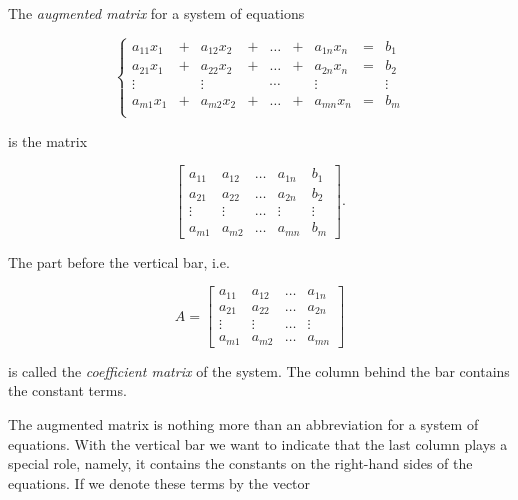 \begin{dfn}
\label{Dfn:LinSystems:AugmentedMatrix}
The \emph{augmented matrix} for a system of equations

$$
   \left\{
\begin{array}{ccccccccc}
            a_{11}x_1\! & \!+\!&\!a_{12}x_2\! & \!+\!&\! \ldots\! & \!+\!&\!a_{1n}x_n  \! & \!=\!&\!  b_1 \\
            a_{21}x_1 \! & \!+\!&\!a_{22}x_2\! & \!+\!&\!\ldots\! & \!+\!&\!a_{2n}x_n  \! & \!=\!&\! b_2 \\
           
            \vdots \! & \! \!&\!  \vdots\! & \! \!&\!\cdots\! & \! \!&\! \vdots     \! & \! \!&\!  \vdots \\
            a_{m1}x_1 \! & \!+\!&\!a_{m2}x_2\! & \!+\!&\! \ldots\! & \!+\!&\!a_{mn}x_n \! & \!=\!&\! b_m \\
          \end{array}
   \right.
$$

is the matrix

$$

   \left[
    \begin{array}{cccc|c}
            a_{11} & a_{12}&  \ldots&   a_{1n}    &  b_1 \\
            a_{21} & a_{22}&  \ldots&   a_{2n}   &  b_2 \\
            \vdots &  \vdots&  \ldots&  \vdots    &  \vdots \\
            a_{m1} & a_{m2}&  \ldots&   a_{mn}    &  b_m
          \end{array}
   \right].
$$


 The part before the vertical bar, i.e.

$$

    A =  \left[
      \begin{array}{cccc}
            a_{11} & a_{12}&  \ldots&   a_{1n} \\
            a_{21} & a_{22}&  \ldots&   a_{2n} \\
            \vdots &  \vdots&  \ldots&  \vdots    \\
            a_{m1} & a_{m2}&  \ldots&   a_{mn}
          \end{array}
   \right]
$$

is called the \emph{coefficient matrix}  of the system.  The column behind the bar contains the constant terms.
\end{dfn}

The augmented matrix is nothing more than an abbreviation for a system of equations.  With the vertical bar we want to indicate that the last column plays a special role, namely, it contains the constants on the right-hand sides of the equations.  If we denote these terms by the vector

